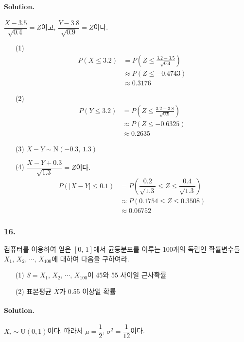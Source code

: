 \paragraph{Solution.} $\dfrac{X-3.5}{\sqrt{0.4}} = Z$이고, $\dfrac{Y-3.8}{\sqrt{0.9}} = Z$이다.

\begin{itemize}
	\item [(1)] {
		\begin{align*}
			P\left(X\leq3.2\right) &= P\left(Z\leq\frac{3.2-3.5}{\sqrt{0.4}}\right)  \\
			&\approx P\left(Z\leq-0.4743\right) \\
			&\approx 0.3176
		\end{align*}
	}
	\item [(2)] {
		\begin{align*}
			P\left(Y\leq3.2\right) &= P\left(Z\leq\frac{3.2-3.8}{\sqrt{0.9}}\right)  \\
			&\approx P\left(Z\leq-0.6325\right) \\
			&\approx 0.2635
		\end{align*}
	}
	\item [(3)] $X-Y \sim \mathrm{N}\left(-0.3,\,1.3\right)$
	\item [(4)] {
		$\dfrac{X-Y+0.3}{\sqrt{1.3}} = Z$이다.
		\begin{align*}
			P\left(\left|X-Y\right|\leq0.1\right) &= P\left(\dfrac{0.2}{\sqrt{1.3}}\leq Z\leq\dfrac{0.4}{\sqrt{1.3}}\right) \\
			&\approx P\left(0.1754\leq Z\leq0.3508\right) \\
			&\approx 0.06752
		\end{align*}
	}
\end{itemize}


\subsubsection{16.} 컴퓨터를 이용하여 얻은 $\left[0,\,1\right]$에서 균등분포를 이루는 100개의 독립인 확률변수들 $X_1,\,X_2,\,\cdots,\,X_{100}$에 대하여
다음을 구하여라.

\begin{itemize}
	\item [(1)] $S=X_1,\,X_2,\,\cdots,\,X_{100}$이 45와 55 사이일 근사확률
	\item [(2)] 표본평균 $\overline{X}$가 0.55 이상일 확률
\end{itemize}

\paragraph{Solution.} $X_i \sim \mathrm{U}\left(0, 1\right)$이다. 따라서 $\mu=\dfrac{1}{2}$, $\sigma^2=\dfrac{1}{12}$이다.

